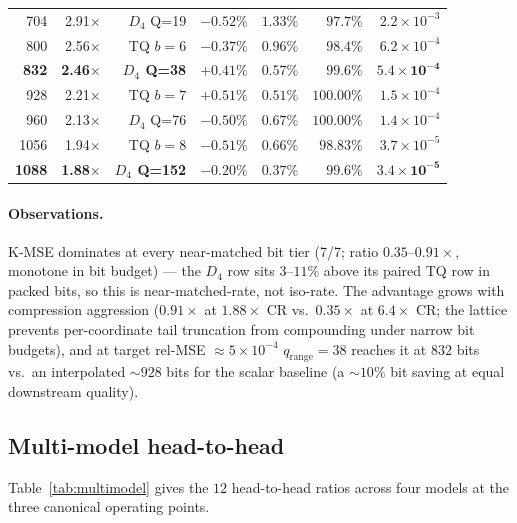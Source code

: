 \documentclass[10pt,a4paper]{article}
\theoremstyle{definition}
\theoremstyle{plain}
\begin{document}
\begin{table}[H]
\begin{tabular}{rrrlrrr}
   704 & 2.91$\times$ & $D_4$ Q=19   & $-0.52\%$  & $1.33\%$  & $97.7\%$ & $2.2\times10^{-3}$ \\
   800 & 2.56$\times$ & TQ $b=6$    & $-0.37\%$  & $0.96\%$  & $98.4\%$ & $6.2\times10^{-4}$ \\
   \textbf{832} & \textbf{2.46}$\times$ & \textbf{$D_4$ Q=38}  & $+0.41\%$  & $0.57\%$  & $\mathbf{99.6\%}$ & $\mathbf{5.4\times10^{-4}}$ \\
   928 & 2.21$\times$ & TQ $b=7$    & $+0.51\%$  & $0.51\%$  & $100.00\%$ & $1.5\times10^{-4}$ \\
   960 & 2.13$\times$ & $D_4$ Q=76   & $-0.50\%$  & $0.67\%$  & $100.00\%$ & $1.4\times10^{-4}$ \\
  1056 & 1.94$\times$ & TQ $b=8$    & $-0.51\%$  & $0.66\%$  & $98.83\%$ & $3.7\times10^{-5}$ \\
  \textbf{1088} & \textbf{1.88}$\times$ & \textbf{$D_4$ Q=152} & $-0.20\%$  & $0.37\%$  & $\mathbf{99.6\%}$ & $\mathbf{3.4\times10^{-5}}$ \\
  \bottomrule
\end{tabular}
\end{table}

\paragraph{Observations.}
K-MSE dominates at every near-matched bit tier (7/7; ratio
$0.35$--$0.91\times$, monotone in bit budget) --- the $D_4$ row
sits $3$--$11\%$ above its paired TQ row in packed bits, so this
is near-matched-rate, not iso-rate. The advantage grows with
compression aggression ($0.91\times$ at $1.88\times$ CR vs.\
$0.35\times$ at $6.4\times$ CR; the lattice prevents
per-coordinate tail truncation from compounding under narrow bit
budgets), and at target rel-MSE $\approx 5\times 10^{-4}$
$q_\mathrm{range}=38$ reaches it at $832$ bits vs.\ an
interpolated $\sim\!928$ bits for the scalar baseline (a
$\sim\!10\%$ bit saving at equal downstream quality).

\subsection{Multi-model head-to-head}
\label{sec:bench-multi}

Table~\ref{tab:multimodel} gives the $12$ head-to-head ratios across
four models at the three canonical operating points.
\end{document}
